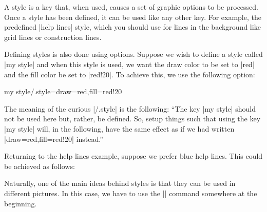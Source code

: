 A style is a key that, when used, causes a set of graphic options to
be processed. Once a style has been defined, it can be used like any
other key. For example, the predefined |help lines| style, which you
should use for lines in the background like grid lines or construction
lines.
\begin{codeexample}[]
\end{codeexample}

Defining styles is also done using options. Suppose we wish to define
a style called |my style| and when this style is used, we want the
draw color to be set to |red| and the fill color be set to
|red!20|. To achieve this, we use the following option:
\begin{codeexample}
my style/.style={draw=red,fill=red!20}
\end{codeexample}

The meaning of the curious |/.style| is the following: ``The key
|my style| should not be used here but, rather, be defined. So, setup
things such that using the key |my style| will, in the following, have
the same effect as if we had written |draw=red,fill=red!20| instead.''

Returning to the help lines example, suppose we prefer blue help
lines. This could be achieved as follows:
\begin{codeexample}[]
\end{codeexample}

Naturally, one of the main ideas behind styles is that they can be
used in different pictures. In this case, we have to use the
|\tikzset| command somewhere at the beginning.
\begin{codeexample}[]
\end{codeexample}

